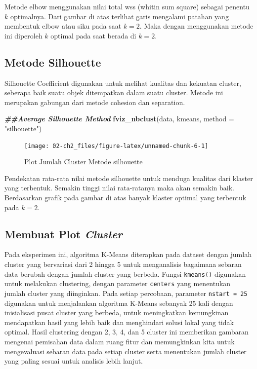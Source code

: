 \documentclass[
  oneside]{book}
\newenvironment{Shaded}{\begin{snugshade}}{\end{snugshade}}
\newcommand{\AttributeTok}[1]{\textcolor[rgb]{0.13,0.29,0.53}{#1}}
\newcommand{\DocumentationTok}[1]{\textcolor[rgb]{0.56,0.35,0.01}{\textbf{\textit{#1}}}}
\newcommand{\FunctionTok}[1]{\textcolor[rgb]{0.13,0.29,0.53}{\textbf{#1}}}
\newcommand{\NormalTok}[1]{#1}
\newcommand{\StringTok}[1]{\textcolor[rgb]{0.31,0.60,0.02}{#1}}
\begin{document}
Metode elbow menggunakan nilai total wss (whitin sum square) sebagai penentu \(k\) optimalnya. Dari gambar di atas terlihat garis mengalami patahan yang membentuk elbow atau siku pada saat \(k=2\). Maka dengan menggunakan metode ini diperoleh \(k\) optimal pada saat berada di \(k=2\).

\subsection*{Metode Silhouette}\label{metode-silhouette}

Silhouette Coefficient digunakan untuk melihat kualitas dan kekuatan cluster, seberapa baik suatu objek ditempatkan dalam suatu cluster. Metode ini merupakan gabungan dari metode cohesion dan separation.

\begin{Shaded}
\begin{Highlighting}[]
\DocumentationTok{\#\#Average Silhouette Method}
\FunctionTok{fviz\_nbclust}\NormalTok{(data, kmeans, }\AttributeTok{method =} \StringTok{"silhouette"}\NormalTok{)}
\end{Highlighting}
\end{Shaded}

\begin{figure}[h]

{\centering \texttt{[image: 02-ch2\_files/figure-latex/unnamed-chunk-6-1]} 

}

\caption{Plot Jumlah Cluster Metode silhouette}\label{fig:unnamed-chunk-6}
\end{figure}

Pendekatan rata-rata nilai metode silhouette untuk menduga kualitas dari klaster yang terbentuk. Semakin tinggi nilai rata-ratanya maka akan semakin baik. Berdasarkan grafik pada gambar di atas banyak klaster optimal yang terbentuk pada \(k=2\).

\subsection*{\texorpdfstring{Membuat Plot \emph{Cluster}}{Membuat Plot Cluster}}\label{membuat-plot-cluster}

Pada eksperimen ini, algoritma K-Means diterapkan pada dataset dengan jumlah cluster yang bervariasi dari 2 hingga 5 untuk menganalisis bagaimana sebaran data berubah dengan jumlah cluster yang berbeda. Fungsi \texttt{kmeans()} digunakan untuk melakukan clustering, dengan parameter \texttt{centers} yang menentukan jumlah cluster yang diinginkan. Pada setiap percobaan, parameter \texttt{nstart\ =\ 25} digunakan untuk menjalankan algoritma K-Means sebanyak 25 kali dengan inisialisasi pusat cluster yang berbeda, untuk meningkatkan kemungkinan mendapatkan hasil yang lebih baik dan menghindari solusi lokal yang tidak optimal. Hasil clustering dengan 2, 3, 4, dan 5 cluster ini memberikan gambaran mengenai pemisahan data dalam ruang fitur dan memungkinkan kita untuk mengevaluasi sebaran data pada setiap cluster serta menentukan jumlah cluster yang paling sesuai untuk analisis lebih lanjut.
\end{document}
